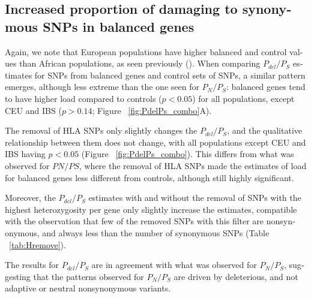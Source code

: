 \begin{refsection}
\begin{otherlanguage}{english}

\subsection{Increased proportion of damaging to synonymous SNPs in balanced genes} 

Again, we note that European populations have higher balanced and control values than African populations, as seen previously (\cite{Lohmueller2008}). When comparing $P_{del}/P_{S}$ estimates for SNPs from balanced genes and control sets of SNPs, a similar pattern emerges, although less extreme than the one seen for $P_{N}/P_{S}$: balanced genes tend to have higher load compared to controls ($p<0.05$) for all populations, except CEU and IBS ($p>0.14$; Figure ~\ref{fig:PdelPs_combo}A).


The removal of HLA SNPs only slightly changes the $P_{del}/P_{S}$, and the qualitative relationship between them does not change, with all populations except CEU and IBS having $p<0.05$ (Figure ~\ref{fig:PdelPs_combo}). This differs from what was observed for $PN/PS$, where the removal of HLA SNPs made the estimates of load for balanced genes less different from controls, although still highly significant. 

Moreover, the $P_{del}/P_{S}$ estimates with and without the removal of SNPs with the highest heterozygosity per gene  only slightly increase the estimates, compatible with the observation that few of the removed SNPs with this filter are nonsynonymous, and always less than the number of synonymous SNPs (Table ~\ref{tab:Hremove}).

The results for $P_{del}/P_{S}$ are in agreement with what was observed for $P_{N}/P_{S}$, suggesting that the patterns observed for $P_{N}/P_{S}$ are driven by deleterious, and not adaptive or neutral nonsynonymous variants. 



\end{otherlanguage}
\end{refsection}

